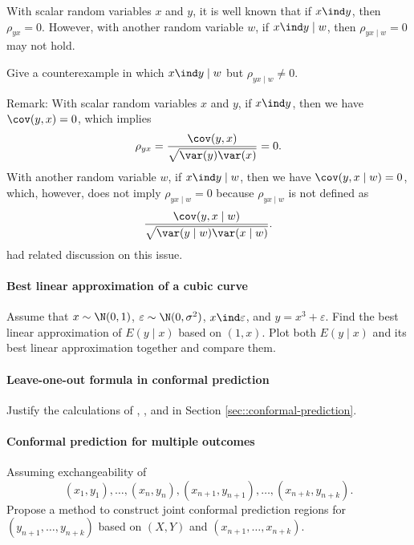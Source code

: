 With scalar random variables $x$ and $y$, it is well known that if $x\ind y$, then $\rho_{yx}=0$. However, with another random variable $w$, if $x\ind y\mid w$, then $\rho_{yx\mid w}=0$ may not hold. 

Give a counterexample in which  $x\ind y\mid w$ but $\rho_{yx\mid w}\neq 0$.


Remark: 
With scalar random variables $x$ and $y$, if $x\ind y$, then we have $\cov(y, x) = 0$,  which implies 
$$
\rho_{yx}=  \frac{ \cov(y, x)  }{ \sqrt{   \var(y)  \var(x)   }  } = 0.
$$
With another random variable $w$, if $x\ind y\mid w$, then we have $\cov(y, x\mid w) = 0$, which, however, does not imply $\rho_{yx\mid w}=0$ because $\rho_{yx\mid w}$ is not defined as 
$$
\frac{ \cov(y, x\mid w)  }{ \sqrt{   \var(y\mid w)  \var(x\mid w)   }  }. 
$$
\citet{shah2020hardness} had related discussion on this issue. 




\paragraph{Best linear approximation of a cubic curve}\label{hw11::bestlinear-cubic}

Assume that $x\sim\N(0,1)$, $\varepsilon\sim\N(0,\sigma^{2})$, $x\ind\varepsilon$,
and $y=x^{3}+\varepsilon$. Find the best linear approximation of
$E(y\mid x)$ based on $(1, x)$.  Plot both $E(y\mid x)$ and its best linear approximation together and compare them. 

 
 

\paragraph{Leave-one-out formula in conformal prediction}\label{hw11::loo-conformal}

Justify the calculations of , , and  in Section \ref{sec::conformal-prediction}. 




\paragraph{Conformal prediction for multiple outcomes}
Assuming exchangeability of 
$$
(x_1,y_1),\ldots,  (x_n,y_n), (x_{n+1},y_{n+1}), \ldots , (x_{n+k},y_{n+k}).   
$$
Propose a method to construct joint conformal prediction regions for $(y_{n+1},\ldots, y_{n+k})$ based on $(X,Y)$ and $(x_{n+1},\ldots, x_{n+k})$.





